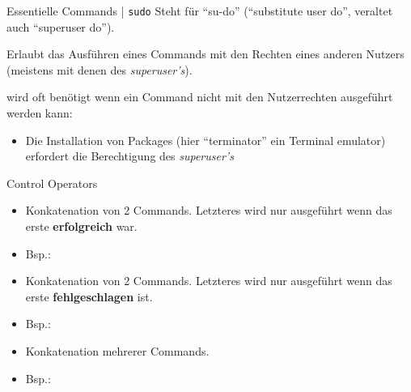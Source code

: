 \documentclass{setbeamer}
\begin{document}
\begin{frame}{Essentielle Commands | \texttt{sudo}}
    Steht für ``su-do'' (``substitute user do'', veraltet auch ``superuser do'').

    \vspace{0.3cm}

    Erlaubt das Ausführen eines Commands mit den Rechten eines anderen Nutzers (meistens mit denen des \emph{superuser's}).

    \vspace{0.3cm}

     wird oft benötigt wenn ein Command nicht mit den Nutzerrechten ausgeführt werden kann:
    \begin{itemize}
        \item {}\textemdash Die Installation von Packages (hier ``terminator'' ein Terminal emulator) erfordert die Berechtigung des \emph{superuser's}
    \end{itemize}
\end{frame}

\begin{frame}[fragile]{Control Operators}
    \begin{itemize}
        \item Konkatenation von 2 Commands. Letzteres wird nur ausgeführt wenn das erste \textbf{erfolgreich} war.
        \item Bsp.: 
    \end{itemize}

    \vspace{0.3cm}

    \begin{itemize}
        \item Konkatenation von 2 Commands. Letzteres wird nur ausgeführt wenn das erste \textbf{fehlgeschlagen} ist.
        \item Bsp.: 
    \end{itemize}

    \vspace{0.3cm}

    \begin{itemize}
        \item Konkatenation mehrerer Commands.
        \item Bsp.: 
    \end{itemize}
\end{frame}
\end{document}
